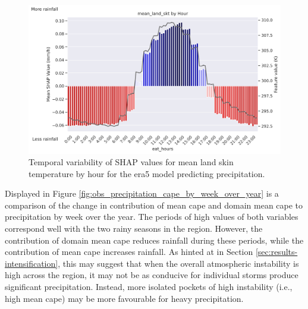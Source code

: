 \begin{figure}[ht]
    \centering
    \includegraphics[width=\textwidth]{../figures/generated/experiments/obs_precipitation/temporal_corr/obs_precipitation_era5_shap_mean_land_skt_by_hour.png}
    \caption{Temporal variability of SHAP values for mean land skin temperature by hour for the \acrshort{era5} model predicting precipitation.}
    \label{fig:obs_precipitation_era5_shap_mean_land_skt_by_hour}
\end{figure}

Displayed in Figure \ref{fig:obs_precipitation_cape_by_week_over_year} is a comparison of the change in contribution of mean \acrshort{cape} and domain mean \acrshort{cape} to precipitation by week over the year. The periods of high values of both variables correspond well with the two rainy seasons in the region. However, the contribution of domain mean \acrshort{cape} reduces rainfall during these periods, while the contribution of mean \acrshort{cape} increases rainfall. As hinted at in Section \ref{sec:results-intensification}, this may suggest that when the overall atmospheric instability is high across the region, it may not be as conducive for individual storms produce significant precipitation. Instead, more isolated pockets of high instability (i.e., high mean \acrshort{cape}) may be more favourable for heavy precipitation.

